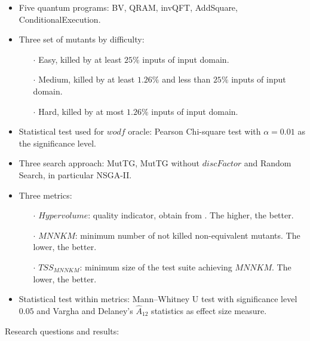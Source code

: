 \begin{itemize}
\begin{itemize}
    \item Five quantum programs: BV, QRAM, invQFT, AddSquare, ConditionalExecution.
    \item Three set of mutants by difficulty: 
        \begin{itemize}
            \item[$\cdot$] Easy, killed by at least $25\%$ inputs of input domain.
            \item[$\cdot$] Medium, killed by at least $1.26\%$ and less than $25\%$ inputs of input domain.
            \item[$\cdot$] Hard, killed by at most $1.26\%$ inputs of input domain.
        \end{itemize}
    \item Statistical test used for $wodf$ oracle: Pearson Chi-square test with $\alpha= 0.01$ as the significance level.
    \item Three search approach: MutTG, MutTG without $discFactor$ and Random Search, in particular NSGA-II.
    \item Three metrics:
        \begin{itemize}
            \item[$\cdot$] $Hypervolume$: quality indicator, obtain from \cite{shang2020survey}. The higher, the better.
            \item[$\cdot$] $MNNKM$: minimum number of not killed non-equivalent mutants. The lower, the better.
            \item[$\cdot$] $TSS_{MNNKM}$: minimum size of the test suite achieving $MNNKM$. The lower, the better.
        \end{itemize}
    \item Statistical test within metrics: Mann–Whitney U test with significance level $0.05$ and Vargha and Delaney’s $\hat{A}_{12}$ statistics as effect size measure.
\end{itemize}

Research questions and results:


\end{itemize}
